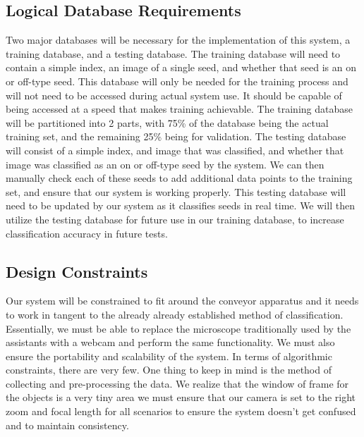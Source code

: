 \documentclass[onecolumn, draftclsnofoot,10pt, compsoc]{IEEEtran}
\begin{document}
\subsection{Logical Database Requirements}
Two major databases will be necessary for the implementation of this system, a training database, and a testing database. The training database will need to contain a simple index, an image of a single seed, and whether that seed is an on or off-type seed. This database will only be needed for the training process and will not need to be accessed during actual system use. It should be capable of being accessed at a speed that makes training achievable. The training database will be partitioned into 2 parts, with 75\% of the database being the actual training set, and the remaining 25\% being for validation. The testing database will consist of a simple index, and image that was classified, and whether that image was classified as an on or off-type seed by the system. We can then manually check each of these seeds to add additional data points to the training set, and ensure that our system is working properly. This testing database will need to be updated by our system as it classifies seeds in real time. We will then utilize the testing database for future use in our training database, to increase classification accuracy in future tests. 

\subsection{Design Constraints}
Our system will be constrained to fit around the conveyor apparatus and it needs to work in tangent to the already already established method of classification. Essentially, we must be able to replace the microscope traditionally used by the assistants with a webcam and perform the same functionality. We must also ensure the portability and scalability of the system. In terms of algorithmic constraints, there are very few. One thing to keep in mind is the method of collecting and pre-processing the data. We realize that the window of frame for the objects is a very tiny area we must ensure that our camera is set to the right zoom and focal length for all scenarios to ensure the system doesn’t get confused and to maintain consistency. 
\end{document}
